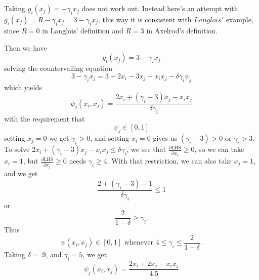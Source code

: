 Taking $g_i(x_j) = - \gamma_i x_j$ does not work out. Instead here's an attempt with $g_i(x_j) = R - \gamma_i x_j = 3 - \gamma_i x_j$, this way it is consistent with $Langlois'$ example, since $R = 0$ in Langlois' definition and $R = 3$ in Axelrod's definition.

Then we have
\[
g_i (x_j) = 3 - \gamma_i x_j
\]
solving the countervailing equation
\[
3 - \gamma_i x_j = 3 + 2 x_i - 3 x_j - x_i x_j - \delta \gamma_i \psi_j
\]
which yields
\[
\psi_j (x_i, x_j) = \frac{2x_i + (\gamma_i - 3) x_j - x_i x_j}{\delta \gamma_i}
\]
with the requirement that
\[
\psi_j  \in [0, 1]
\]
setting $x_j = 0$ we get $\gamma_i > 0$, and setting $x_i = 0$ gives us $(\gamma_i - 3) > 0$ or $\gamma_i > 3$. To solve $2 x_i + (\gamma_i - 3) x_j - x_i x_j \leq \delta \gamma_i$, we see that $\frac{\partial\textrm{LHS}}{\partial x_i} \geq 0$, so we can take $x_i = 1$, but $\frac{\partial\textrm{LHS}}{\partial x_j} \geq 0$ needs $\gamma_i \geq 4$. With that restriction, we can also take $x_j = 1$, and we get
\[
\frac{2 + (\gamma_i - 3) -1}{\delta \gamma_i} \leq 1
\]
or
\[
\frac{2}{1-\delta} \geq \gamma_i.
\]
Thus
\[
\psi(x_i, x_j) \in [0, 1] \textrm{ whenever } 4 \leq \gamma_i \leq \frac{2}{1-\delta}.
\]
Taking $\delta = .9$, and $\gamma_i = 5$, we get
\[
\psi_j (x_i, x_j) = \frac{2x_i + 2x_j - x_i x_j}{4.5}
\]
